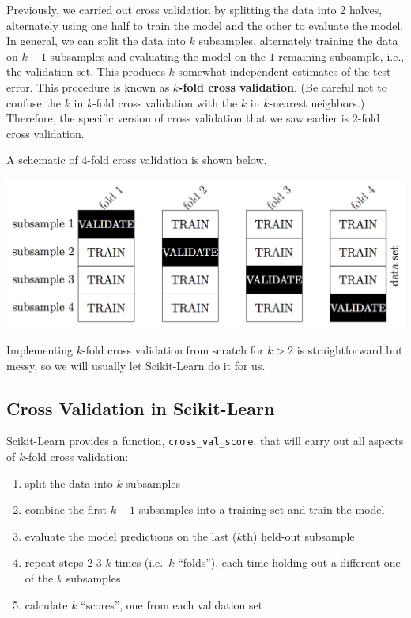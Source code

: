 \documentclass[11pt]{article}
\makeatletter
\def\maxwidth{\ifdim\Gin@nat@width>\linewidth\linewidth
    \else\Gin@nat@width\fi}
\let\Oldincludegraphics\includegraphics
\renewcommand{\includegraphics}[1]{\Oldincludegraphics[width=.8\maxwidth]{#1}}
\providecommand{\tightlist}{%
      \setlength{\itemsep}{0pt}\setlength{\parskip}{0pt}}
\makeatother
\begin{document}
Previously, we carried out cross validation by splitting the data into 2
halves, alternately using one half to train the model and the other to
evaluate the model. In general, we can split the data into \(k\)
subsamples, alternately training the data on \(k-1\) subsamples and
evaluating the model on the \(1\) remaining subsample, i.e., the
validation set. This produces \(k\) somewhat independent estimates of
the test error. This procedure is known as \textbf{\(k\)-fold cross
validation}. (Be careful not to confuse the \(k\) in \(k\)-fold cross
validation with the \(k\) in \(k\)-nearest neighbors.) Therefore, the
specific version of cross validation that we saw earlier is \(2\)-fold
cross validation.

A schematic of \(4\)-fold cross validation is shown below.

\includegraphics{k-folds.png}

Implementing \(k\)-fold cross validation from scratch for \(k > 2\) is
straightforward but messy, so we will usually let Scikit-Learn do it for
us.

    \hypertarget{cross-validation-in-scikit-learn}{%
\subsection{Cross Validation in
Scikit-Learn}\label{cross-validation-in-scikit-learn}}

Scikit-Learn provides a function, \texttt{cross\_val\_score}, that will
carry out all aspects of \(k\)-fold cross validation:

\begin{enumerate}
\def\labelenumi{\arabic{enumi}.}
\tightlist
\item
  split the data into \(k\) subsamples
\item
  combine the first \(k-1\) subsamples into a training set and train the
  model
\item
  evaluate the model predictions on the last (\(k\)th) held-out
  subsample
\item
  repeat steps 2-3 \(k\) times (i.e.~\(k\) ``folds''), each time holding
  out a different one of the \(k\) subsamples
\item
  calculate \(k\) ``scores'', one from each validation set
\end{enumerate}
\end{document}
